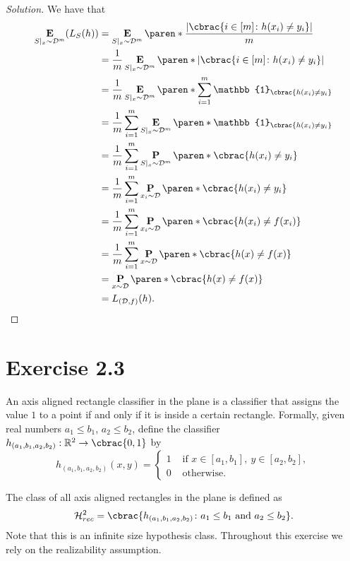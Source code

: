 \documentclass[10pt, a4paper, twoside]{amsart}
\newcommand{\R}{\ensuremath{\mathbb{R}}}
\DeclarePairedDelimiter\abs{\lvert}{\rvert}
\DeclarePairedDelimiter\cbrac\{\}
\DeclarePairedDelimiter\paren()
\renewcommand{\c}{\ensuremath{\colon}}
\newcommand{\Ind}{\ensuremath{\mathbb{1}}}
\renewcommand{\P}{\operatorname*{\ensuremath{\mathbf{P}}}}
\newcommand{\Ev}{\operatorname*{\ensuremath{\mathbf{E}}}}
\newenvironment{solution}
               {\let\oldqedsymbol=\qedsymbol
                \renewcommand{\qedsymbol}{$\blacktriangleleft$}
                \begin{proof}[Solution]}
               {\end{proof}
                \renewcommand{\qedsymbol}{\oldqedsymbol}}
\begin{document}
\begin{solution}
We have that
\begin{align*}
 \Ev\limits_{S|_x \sim \mathcal{D}^m}(L_{S}(h)) 
 &=\Ev\limits_{S|_x \sim \mathcal{D}^m}\paren*{\frac{\abs{\cbrac{i\in [m] \c h(x_i) \neq y_i}}}{m}} \\
 &=\frac{1}{m}\Ev\limits_{S|_x \sim \mathcal{D}^m}\paren*{\abs{\cbrac{i\in [m] \c h(x_i) \neq y_i}}} \\
 &=\frac{1}{m}\Ev\limits_{S|_x \sim \mathcal{D}^m}\paren*{\sum_{i=1}^m \Ind_{\cbrac{h(x_i)\neq y_i}}} \\
 &=\frac{1}{m}\sum_{i=1}^m \Ev\limits_{S|_x \sim \mathcal{D}^m}\paren*{\Ind_{\cbrac{h(x_i)\neq y_i}}} \\
 &=\frac{1}{m}\sum_{i=1}^m \P\limits_{S|_x \sim \mathcal{D}^m}\paren*{\cbrac{h(x_i)\neq y_i}} \\
 &=\frac{1}{m}\sum_{i=1}^m \P\limits_{x_i \sim \mathcal{D}}\paren*{\cbrac{h(x_i)\neq y_i}} \\
 &=\frac{1}{m}\sum_{i=1}^m \P\limits_{x_i \sim \mathcal{D}}\paren*{\cbrac{h(x_i)\neq f(x_i)}} \\
 &=\frac{1}{m}\sum_{i=1}^m \P\limits_{x \sim \mathcal{D}}\paren*{\cbrac{h(x)\neq f(x)}} \\
 &=\P\limits_{x \sim \mathcal{D}}\paren*{\cbrac{h(x)\neq f(x)}} \\
 &=L_{(\mathcal{D},f)}(h).
\end{align*}



\end{solution}


\section*{Exercise 2.3}
An axis aligned rectangle classifier in the plane is a classifier that assigns the value $1$ to a point 
if and only if it is inside a certain rectangle. 
Formally, given real numbers $a_1 \leq b_1$, $a_2 \leq b_2$, define the classifier $h_{(a_1, b_1, a_2, b_2)}:\R^2\to\cbrac{0,1}$ by
\begin{equation*}
h_{(a_1, b_1, a_2, b_2)}(x, y)=
\begin{cases}
 1 & \text{ if }x \in [a_1, b_1], \ y \in [a_2, b_2], \\
 0 & \text{ otherwise}.
\end{cases}
\end{equation*}

The class of all axis aligned rectangles in the plane is defined as
\begin{equation*}
\mathcal{H}^2_{rec}=\cbrac{h_{(a_1, b_1, a_2, b_2)} \c a_1 \leq b_1 \text{ and } a_2 \leq b_2}.
\end{equation*}
Note that this is an infinite size hypothesis class. Throughout this exercise we rely on the realizability assumption.
\end{document}
